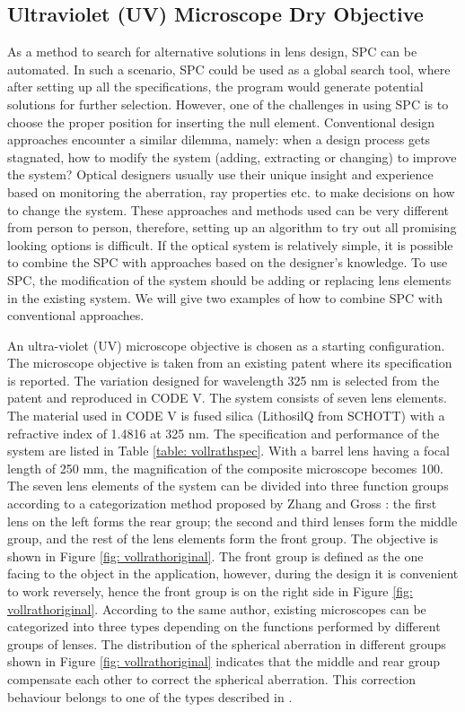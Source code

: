 \subsection{Ultraviolet (UV) Microscope Dry Objective}
As a method to search for alternative solutions in lens design, SPC can be automated. In such a scenario, SPC could be used as a global search tool, where after setting up all the specifications, the program would generate potential solutions for further selection. However, one of the challenges in using SPC is to choose the proper position for inserting the null element. Conventional design approaches encounter a similar dilemma, namely: when a design process gets stagnated, how to modify the system (adding, extracting or changing) to improve the system? Optical designers usually use their unique insight and experience based on monitoring the aberration, ray properties etc. to make decisions on how to change the system. These approaches and methods used can be very different from person to person, therefore, setting up an algorithm to try out all promising looking options is difficult. If the optical system is relatively simple, it is possible to combine the SPC with approaches based on the designer's knowledge. To use SPC, the modification of the system should be adding or replacing lens elements in the existing system. We will give two examples of how to combine SPC with conventional approaches. 

An ultra-violet (UV) microscope objective is chosen as a starting configuration. The microscope objective is taken from an existing patent\cite{patentvollrath} where its specification is reported. The variation designed for wavelength 325 nm is selected from the patent and reproduced in CODE V. The system consists of seven lens elements. The material used in CODE V is fused silica (LithosilQ from SCHOTT) with a refractive index of 1.4816 at 325 nm. The specification and performance of the system are listed in Table \ref{table: vollrathspec}. With a barrel lens having a focal length of 250 mm, the magnification of the composite microscope becomes 100. The seven lens elements of the system can be divided into three function groups according to a categorization method proposed by Zhang and Gross \cite{ZhangMicroscope2017}: the first lens on the left forms the rear group; the second and third lenses form the middle group, and the rest of the lens elements form the front group. The objective is shown in Figure \ref{fig: vollrathoriginal}. The front group is defined as the one facing to the object in the application, however, during the design it is convenient to work reversely, hence the front group is on the right side in Figure \ref{fig: vollrathoriginal}. According to the same author, existing microscopes can be categorized into three types depending on the functions performed by different groups of lenses. The distribution of the spherical aberration in different groups shown in Figure \ref{fig: vollrathoriginal} indicates that the middle and rear group compensate each other to correct the spherical aberration. This correction behaviour belongs to one of the types described in \cite{ZhangMicroscope2017}.

